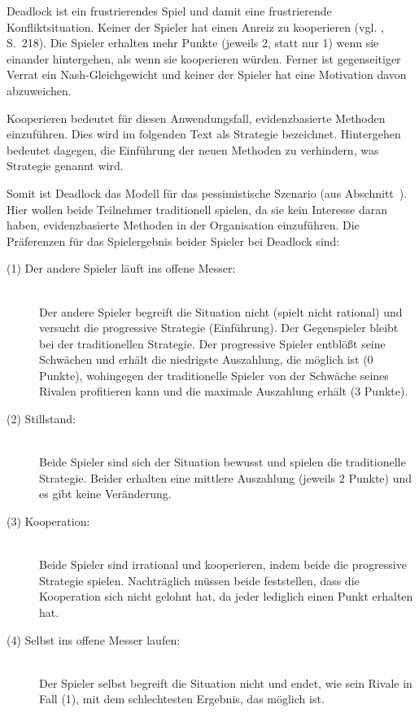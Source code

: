 Deadlock ist ein frustrierendes Spiel und damit eine frustrierende Konfliktsituation. Keiner der Spieler hat einen Anreiz
zu kooperieren (vgl. \cite{Poundstone}, S.~218). Die Spieler erhalten mehr Punkte (jeweils 2, statt nur 1) wenn sie einander hintergehen,
als wenn sie kooperieren würden. Ferner ist gegenseitiger Verrat ein Nash-Gleichgewicht und keiner der Spieler hat eine Motivation davon
abzuweichen.

Kooperieren bedeutet für diesen Anwendungsfall, evidenzbasierte Methoden einzuführen. Dies wird im
folgenden Text als \grqq{} Strategie bezeichnet. Hintergehen bedeutet dagegen, die
Einführung der neuen Methoden zu verhindern, was \grqq{} Strategie genannt wird.
 
Somit ist Deadlock das Modell für das pessimistische Szenario (aus Abschnitt~\xcom). 
Hier wollen beide Teilnehmer traditionell spielen, da sie kein Interesse daran haben, evidenzbasierte Methoden
in der Organisation einzuführen. Die Präferenzen für das Spielergebnis beider Spieler bei Deadlock sind:

\begin{description}

\item[(1) Der andere Spieler läuft ins offene Messer:] \hfill \\
Der andere Spieler begreift die Situation nicht (spielt nicht rational) und versucht die progressive Strategie (Einführung).
Der Gegenspieler bleibt bei der traditionellen Strategie. Der progressive Spieler entblößt seine Schwächen und erhält die
niedrigste Auszahlung, die möglich ist (0 Punkte), wohingegen der traditionelle Spieler von der Schwäche seines Rivalen
profitieren kann und die maximale Auszahlung erhält (3 Punkte).
 
\item[(2) Stillstand:] \hfill \\
Beide Spieler sind sich der Situation bewusst und spielen die traditionelle Strategie.
Beider erhalten eine mittlere Auszahlung (jeweils 2 Punkte) und es gibt keine Veränderung.

\item[(3) Kooperation:] \hfill \\
Beide Spieler sind irrational und kooperieren, indem beide die progressive Strategie spielen.
Nachträglich müssen beide feststellen, dass die Kooperation sich nicht gelohnt hat, da jeder
lediglich einen Punkt erhalten hat.

\item[(4) Selbst ins offene Messer laufen:] \hfill \\
Der Spieler selbst begreift die Situation nicht und endet, wie sein Rivale in Fall (1), mit dem
schlechtesten Ergebnis, das möglich ist.

\end{description}

